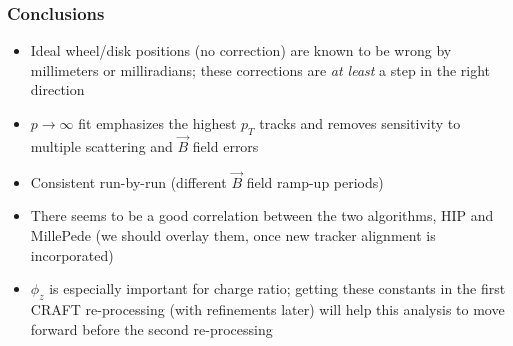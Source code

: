 \documentclass[compress]{beamer}
\begin{document}
\begin{frame}
\frametitle{Conclusions}
\begin{itemize}\setlength{\itemsep}{0.25 cm}
\item Ideal wheel/disk positions (no correction) are known to be wrong
  by millimeters or milliradians; these corrections are {\it at least} a
  step in the right direction
\item $p\to\infty$ fit emphasizes the highest $p_T$ tracks and removes
  sensitivity to multiple scattering and $\vec{B}$ field errors
\item Consistent run-by-run (different $\vec{B}$ field ramp-up periods)
\item There seems to be a good correlation between the two algorithms,
  HIP and MillePede (we should overlay them, once new tracker
  alignment is incorporated)
\item $\phi_z$ is especially important for charge ratio; getting these
  constants in the first CRAFT re-processing (with refinements later)
  will help this analysis to move forward before the second re-processing
\end{itemize}
\label{numpages}
\end{frame}
\end{document}
